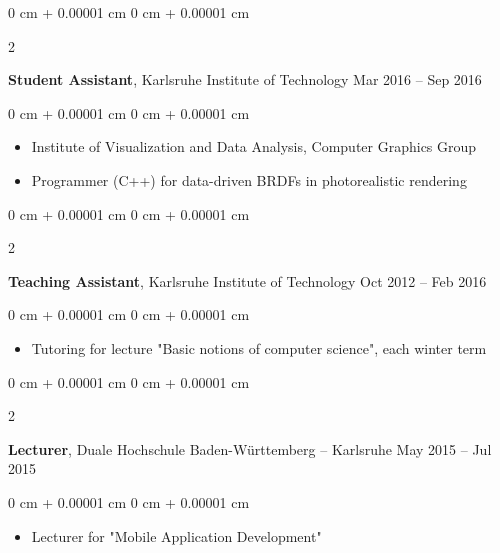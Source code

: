 \documentclass[10pt, letterpaper]{article}
\newenvironment{highlights}{
    \begin{itemize}[
        topsep=0.10 cm,
        parsep=0.10 cm,
        partopsep=0pt,
        itemsep=0pt,
        leftmargin=0 cm + 10pt
    ]
}{
    \end{itemize}
} %
\newenvironment{onecolentry}{
    \begin{adjustwidth}{
        0 cm + 0.00001 cm
    }{
        0 cm + 0.00001 cm
    }
}{
    \end{adjustwidth}
} %
\newenvironment{twocolentry}[2][]{
    \onecolentry
    \def\secondColumn{#2}
    \setcolumnwidth{\fill, 4.5 cm}
    \begin{paracol}{2}
}{
    \switchcolumn \raggedleft \secondColumn
    \end{paracol}
    \endonecolentry
} %
\begin{document}
        \expspace

        \begin{twocolentry}{
            Mar 2016 – Sep 2016
        }
            \textbf{Student Assistant}, Karlsruhe Institute of Technology\end{twocolentry}

        \vspace{0.10 cm}
        \begin{onecolentry}
            \begin{highlights}
                \item Institute of Visualization and Data Analysis, Computer Graphics Group
                \item Programmer (C++) for data-driven BRDFs in photorealistic rendering
            \end{highlights}
        \end{onecolentry}


        \expspace

        \begin{twocolentry}{
            Oct 2012 – Feb 2016
        }
            \textbf{Teaching Assistant}, Karlsruhe Institute of Technology\end{twocolentry}

        \vspace{0.10 cm}
        \begin{onecolentry}
            \begin{highlights}
                \item Tutoring for lecture "Basic notions of computer science", each winter term
            \end{highlights}
        \end{onecolentry}


        \expspace

        \begin{twocolentry}{
            May 2015 – Jul 2015
        }
            \textbf{Lecturer}, Duale Hochschule Baden-Württemberg -- Karlsruhe\end{twocolentry}

        \vspace{0.10 cm}
        \begin{onecolentry}
            \begin{highlights}
                \item Lecturer for "Mobile Application Development"
            \end{highlights}
        \end{onecolentry}
\end{document}
